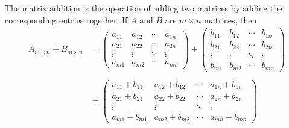 	\begin{definition}
		The matrix addition is the operation of adding two matrices by adding the corresponding entries together. If $A$ and $B$ are $m \times n$ matrices, then
		\begin{align*}
	{A_{m \times n}} + {B_{m \times n}} &= \begin{pmatrix}
		{{a_{11}}}&{{a_{12}}}& \cdots &{{a_{1n}}}\\
		{{a_{21}}}&{{a_{22}}}& \cdots &{{a_{2n}}}\\
		\vdots & \vdots & \ddots & \vdots \\
		{{a_{m1}}}&{{a_{m2}}}& \cdots &{{a_{mn}}}
		\end{pmatrix} + \begin{pmatrix}
		{{b_{11}}}&{{b_{12}}}& \cdots &{{b_{1n}}}\\
		{{b_{21}}}&{{b_{22}}}& \cdots &{{b_{2n}}}\\
		\vdots & \vdots & \ddots & \vdots \\
		{{b_{m1}}}&{{b_{m2}}}& \cdots &{{b_{mn}}}
		\end{pmatrix}\\
	\\
	&= \begin{pmatrix}
		{{a_{11}} + {b_{11}}}&{{a_{12}} + {b_{12}}}& \cdots &{{a_{1n}} + {b_{1n}}}\\
		{{a_{21}} + {b_{21}}}&{{a_{22}} + {b_{22}}}& \cdots &{{a_{2n}} + {b_{2n}}}\\
		\vdots & \vdots & \ddots & \vdots \\
		{{a_{m1}} + {b_{m1}}}&{{a_{m2}} + {b_{m2}}}& \cdots &{{a_{mn}} + {b_{mn}}}
		\end{pmatrix}
		\end{align*}


	\end{definition}



